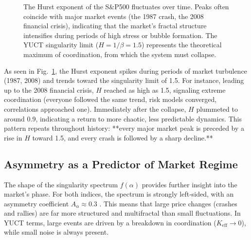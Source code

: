 \documentclass[11pt,a4paper]{article}
\theoremstyle{remark}
\begin{document}
\begin{figure}[htbp]
	\centering
	\caption{The Hurst exponent of the S\&P500 fluctuates over time. Peaks often coincide with major market events (the 1987 crash, the 2008 financial crisis), indicating that the market’s fractal structure intensifies during periods of high stress or bubble formation. The YUCT singularity limit (\(H=1/\beta=1.5\)) represents the theoretical maximum of coordination, from which the system must collapse.}
	\label{fig:hurst}
\end{figure}

As seen in Fig.~\ref{fig:hurst}, the Hurst exponent spikes during periods of market turbulence (1987, 2008) and trends toward the singularity limit of 1.5. For instance, leading up to the 2008 financial crisis, \(H\) reached as high as 1.5, signaling extreme coordination (everyone followed the same trend, risk models converged, correlations approached one). Immediately after the collapse, \(H\) plummeted to around 0.9, indicating a return to more chaotic, less predictable dynamics. This pattern repeats throughout history: **every major market peak is preceded by a rise in \(H\) toward 1.5, and every crash is followed by a sharp decline.**

\subsection{Asymmetry as a Predictor of Market Regime}
The shape of the singularity spectrum \(f(\alpha)\) provides further insight into the market’s phase. For both indices, the spectrum is strongly left‑sided, with an asymmetry coefficient \(A_\alpha \approx 0.3\) \cite{Dutta2022}. This means that large price changes (crashes and rallies) are far more structured and multifractal than small fluctuations. In YUCT terms, large events are driven by a breakdown in coordination (\(K_{\mathrm{eff}} \to 0\)), while small noise is always present.
\end{document}
